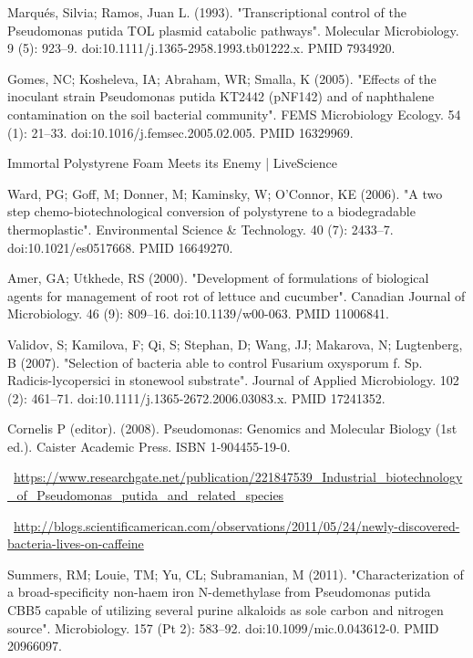 \documentclass[11pt]{article}
\begin{document}
\begin{thebibliography}{3}
	 Marqués, Silvia; Ramos, Juan L. (1993). "Transcriptional control of the Pseudomonas putida TOL plasmid catabolic pathways". Molecular Microbiology. 9 (5): 923–9. doi:10.1111/j.1365-2958.1993.tb01222.x. PMID 7934920.
	
	 Gomes, NC; Kosheleva, IA; Abraham, WR; Smalla, K (2005). "Effects of the inoculant strain Pseudomonas putida KT2442 (pNF142) and of naphthalene contamination on the soil bacterial community". FEMS Microbiology Ecology. 54 (1): 21–33. doi:10.1016/j.femsec.2005.02.005. PMID 16329969.
	
	 Immortal Polystyrene Foam Meets its Enemy | LiveScience

	 Ward, PG; Goff, M; Donner, M; Kaminsky, W; O'Connor, KE (2006). "A two step chemo-biotechnological conversion of polystyrene to a biodegradable thermoplastic". Environmental Science \& Technology. 40 (7): 2433–7. doi:10.1021/es0517668. PMID 16649270.
	
	 Amer, GA; Utkhede, RS (2000). "Development of formulations of biological agents for management of root rot of lettuce and cucumber". Canadian Journal of Microbiology. 46 (9): 809–16. doi:10.1139/w00-063. PMID 11006841.
	 
	 Validov, S; Kamilova, F; Qi, S; Stephan, D; Wang, JJ; Makarova, N; Lugtenberg, B (2007). "Selection of bacteria able to control Fusarium oxysporum f. Sp. Radicis-lycopersici in stonewool substrate". Journal of Applied Microbiology. 102 (2): 461–71. doi:10.1111/j.1365-2672.2006.03083.x. PMID 17241352.
	
	 Cornelis P (editor). (2008). Pseudomonas: Genomics and Molecular Biology (1st ed.). Caister Academic Press. ISBN 1-904455-19-0.
	
	 ~\url{https://www.researchgate.net/publication/221847539_Industrial_biotechnology_of_Pseudomonas_putida_and_related_species}

	 ~\url{http://blogs.scientificamerican.com/observations/2011/05/24/newly-discovered-bacteria-lives-on-caffeine}
	
	 Summers, RM; Louie, TM; Yu, CL; Subramanian, M (2011). "Characterization of a broad-specificity non-haem iron N-demethylase from Pseudomonas putida CBB5 capable of utilizing several purine alkaloids as sole carbon and nitrogen source". Microbiology. 157 (Pt 2): 583–92. doi:10.1099/mic.0.043612-0. PMID 20966097.
	

\end{thebibliography}
\end{document}
